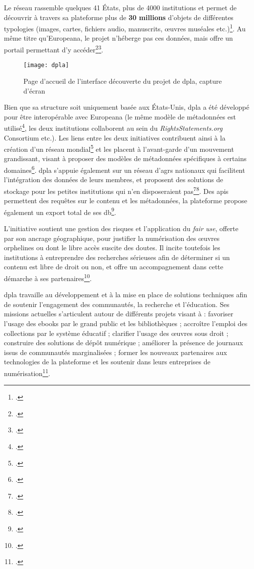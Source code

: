 Le réseau rassemble quelques 41 États, plus de 4000 institutions et permet de découvrir à travers sa plateforme plus de \textbf{30 millions} d'objets de différentes typologies (images, cartes, fichiers audio, manuscrits, \oe{}uvres muséales etc.)\footcite{digital_public_library_of_america_strategic_nodate}. Au même titre qu'Europeana, le projet n'héberge pas ces données, mais offre un portail permettant d'y accéder\footcite{pomerantz_metadata_2015}\footcite{xie_discover_2016}.

\begin{figure}[H]%
\centering
\texttt{[image: dpla]}
\caption{Page d'accueil de l'interface découverte du projet de \gls{dpla}, capture d'écran}
\end{figure}

Bien que sa structure soit uniquement basée aux États-Unis, \gls{dpla} a été développé pour être interopérable avec Europeana (le même modèle de métadonnées est utilisé\footcite{digital_public_library_of_america_metadata_nodate}, les deux institutions collaborent au sein du \textit{RightsStatements.org} Consortium etc.). Les liens entre les deux initiatives contribuent ainsi à la création d'un réseau mondial\footcite{xie_discover_2016} et les placent à l'avant-garde d'un mouvement grandissant, visant à proposer des modèles de métadonnées spécifiques à certains domaines\footcite{pomerantz_metadata_2015}. \gls{dpla} s'appuie également sur un réseau d'\gls{agr}s nationaux qui facilitent l'intégration des données de leurs membres, et proposent des solutions de stockage pour les petites institutions qui n'en disposeraient pas\footcite{digital_public_library_of_america_becoming_nodate}\footcite{xie_discover_2016}. Des \gls{api}s permettent des requêtes sur le contenu et les métadonnées, la plateforme propose également un export total de ses \gls{db}\footcite{xie_discover_2016}.

L'initiative soutient une gestion des risques et l'application du \textit{fair use}, offerte par son ancrage géographique, pour justifier la numérisation des \oe{}uvres orphelines ou dont le libre accès suscite des doutes. Il incite toutefois les institutions à entreprendre des recherches sérieuses afin de déterminer si un contenu est libre de droit ou non, et offre un accompagnement dans cette démarche à ses partenaires\footcite{digital_public_library_of_america_understanding_nodate}. 

\gls{dpla} travaille au développement et à la mise en place de solutions techniques afin de soutenir l'engagement des communautés, la recherche et l'éducation. Ses missions actuelles s'articulent autour de différents projets visant à : favoriser l'usage des ebooks par le grand public et les bibliothèques ; accroître l'emploi des collections par le système éducatif ; clarifier l'usage des \oe{}uvres sous droit ; construire des solutions de dépôt numérique ; améliorer la présence de journaux issus de communautés marginalisées ; former les nouveaux partenaires aux technologies de la plateforme et les soutenir dans leurs entreprises de numérisation\footcite{digital_public_library_of_america_projects_nodate}. 

